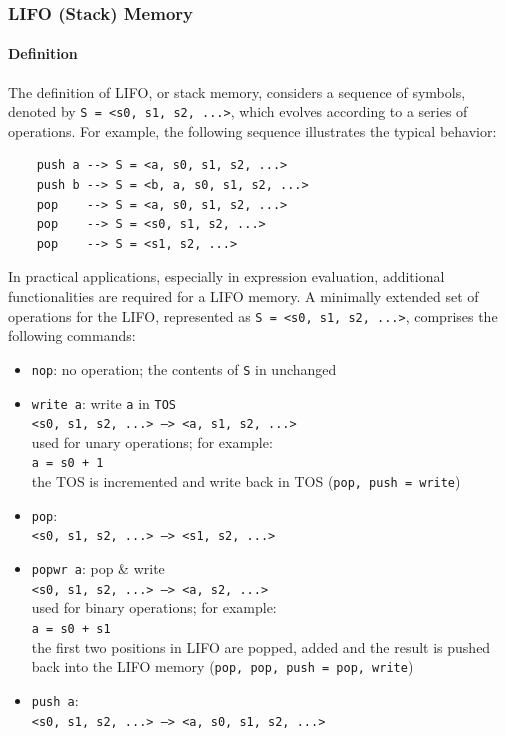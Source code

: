 \subsubsection{LIFO (Stack) Memory}\label{lb:lifo}
\paragraph{Definition}  The definition of LIFO, or stack memory, considers a sequence of symbols, denoted by \texttt{S = <s0, s1, s2, ...>}, which evolves according to a series of operations.  For example, the following sequence illustrates the typical behavior: 
\begin{verbatim}
    push a --> S = <a, s0, s1, s2, ...>
    push b --> S = <b, a, s0, s1, s2, ...>
    pop    --> S = <a, s0, s1, s2, ...>
    pop    --> S = <s0, s1, s2, ...>
    pop    --> S = <s1, s2, ...>
\end{verbatim}

In practical applications, especially in expression evaluation, additional functionalities are required for a LIFO memory. A minimally extended set of operations for the LIFO, represented as \texttt{S = <s0, s1, s2, ...>}, comprises the following commands:
\begin{itemize}
\item {\tt nop}: no operation; the contents of {\tt S} in unchanged
\item {\tt write a}: write {\tt a} in {\tt TOS} \\{\tt <s0, s1, s2, ...> --> <a, s1, s2, ...>}\\used for unary operations; for example: \\{\tt a = s0 + 1}\\
the TOS is incremented and write back in TOS ({\tt pop, push = write})
\item {\tt pop}: \\{\tt <s0, s1, s2, ...> --> <s1, s2, ...>}
\item {\tt popwr a}: pop \& write \\{\tt <s0, s1, s2, ...> --> <a, s2, ...>}\\used for binary operations; for example: \\{\tt a = s0 + s1}\\
the first two positions in LIFO are popped, added and the result is pushed back into the LIFO memory ({\tt pop, pop, push = pop, write})
\item {\tt push a}: \\{\tt <s0, s1, s2, ...> --> <a, s0, s1, s2, ...>}
\end{itemize}

